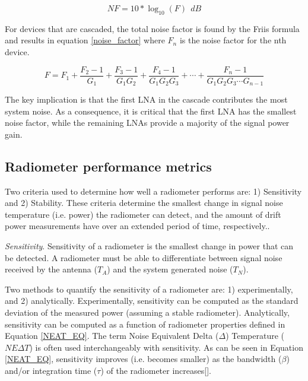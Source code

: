 \begin{equation}\label{noise_figure}
NF=10 * \log_{10}(F)\ \ dB
\end{equation}

For devices that are cascaded, the total noise factor is found by the Friis formula and results in equation \ref{noise_factor} where $F_n$ is the noise factor for the nth device.  

\begin{equation}\label{noise_factor}
F=F_1+\frac{F_2-1}{G_1}+\frac{F_3-1}{G_1 G_2}+\frac{F_4-1}{G_1 G_2 G_3}+\cdots +\frac{F_n-1}{G_1 G_2 G_3 \cdots G_{n-1}}
\end{equation}

The key implication is that the first LNA in the cascade contributes the most system noise.  As a consequence, it is critical that the first LNA has the smallest noise factor, while the remaining LNAs provide a majority of the signal power gain.

\subsection{Radiometer performance metrics}\label{performance_metrics}

Two criteria used to determine how well a radiometer performs are: 1) Sensitivity and 2) Stability.  These criteria determine the smallest change in signal noise temperature (i.e. power) the radiometer can detect, and the amount of drift power measurements have over an extended period of time, respectively..

\emph{Sensitivity}.  Sensitivity of a radiometer is the smallest change in power that can be detected.  A radiometer must be able to differentiate between signal noise received by  the antenna ($T_{A}$) and the system generated noise ($T_N$).

Two methods to quantify the sensitivity of a radiometer are: 1) experimentally, and 2) analytically.  Experimentally, sensitivity can be computed as the standard deviation of the measured power (assuming a stable radiometer).  Analytically, sensitivity can be computed as a function of radiometer properties defined in Equation \ref{NEAT_EQ}.  The term Noise Equivalent Delta ($\Delta$) Temperature ($NE\Delta T$) is often used interchangeably with sensitivity.  As can be seen in Equation \ref{NEAT_EQ}, sensitivity improves (i.e. becomes smaller) as the bandwidth ($\beta$) and/or integration time ($\tau$) of the radiometer increases[\cite{ulaby}].

